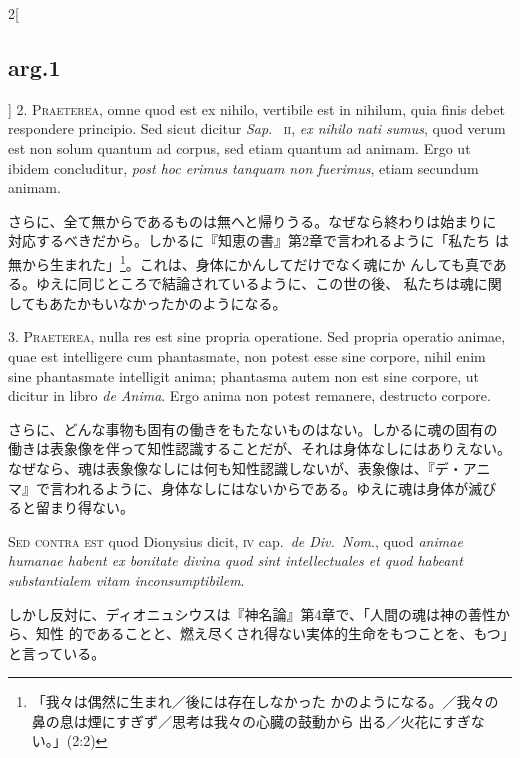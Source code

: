 \documentclass[paper=a4paper,fontsize=10pt,jafontsize=9pt,titlepage]{jlreq}
\begin{document}
\begin{paracol}{2}[\subsection{arg.1}]
2. {\scshape Praeterea}, omne quod est ex nihilo, vertibile est in nihilum, quia
finis debet respondere principio. Sed sicut dicitur {\itshape Sap}.~{\scshape
ii}, {\itshape ex nihilo nati sumus}, quod verum est non solum quantum ad
corpus, sed etiam quantum ad animam. Ergo ut ibidem concluditur, {\itshape post
hoc erimus tanquam non fuerimus}, etiam secundum animam.


\switchcolumn

さらに、全て無からであるものは無へと帰りうる。なぜなら終わりは始まりに
対応するべきだから。しかるに『知恵の書』第2章で言われるように「私たち
は無から生まれた」\footnote{「我々は偶然に生まれ／後には存在しなかった
かのようになる。／我々の鼻の息は煙にすぎず／思考は我々の心臓の鼓動から
出る／火花にすぎない。」(2:2)}。これは、身体にかんしてだけでなく魂にか
んしても真である。ゆえに同じところで結論されているように、この世の後、
私たちは魂に関してもあたかもいなかったかのようになる。


3. {\scshape Praeterea}, nulla res est sine propria operatione. Sed propria
operatio animae, quae est intelligere cum phantasmate, non potest esse sine
corpore, nihil enim sine phantasmate intelligit anima; phantasma autem non est
sine corpore, ut dicitur in libro {\itshape de Anima}. Ergo anima non potest
remanere, destructo corpore.

\switchcolumn

さらに、どんな事物も固有の働きをもたないものはない。しかるに魂の固有の
働きは表象像を伴って知性認識することだが、それは身体なしにはありえない。
なぜなら、魂は表象像なしには何も知性認識しないが、表象像は、『デ・アニ
マ』で言われるように、身体なしにはないからである。ゆえに魂は身体が滅び
ると留まり得ない。

\switchcolumn*[\subsection{s.c.}]

{\scshape Sed contra est} quod Dionysius dicit, {\scshape iv} cap.~{\itshape de
Div.~Nom}., quod {\itshape animae humanae habent ex bonitate divina quod sint
{\itshape intellectuales} et quod habeant {\itshape substantialem vitam
inconsumptibilem}}.

\switchcolumn

しかし反対に、ディオニュシウスは『神名論』第4章で、「人間の魂は神の善性から、知性
 的であることと、燃え尽くされ得ない実体的生命をもつことを、もつ」と言っている。


\end{paracol}
\end{document}
